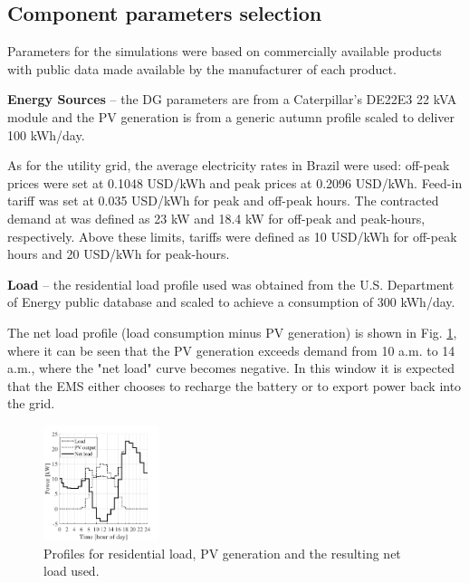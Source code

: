 \documentclass{ieeeaccess}
\begin{document}
    \subsection{Component parameters selection}
    Parameters for the simulations were based on commercially available products with public data made available by the manufacturer of each product.
    
    \textbf{Energy Sources} -- the \ac{DG} parameters are from a Caterpillar's DE22E3 22 kVA module and the \ac{PV} generation is from a generic autumn profile scaled to deliver 100 kWh/day.
    
    As for the utility grid, the average electricity rates in Brazil were used: off-peak prices were set at 0.1048 USD/kWh and peak prices at 0.2096 USD/kWh. Feed-in tariff was set at 0.035 USD/kWh for peak and off-peak hours. The contracted demand at was defined as 23 kW and 18.4 kW for off-peak and peak-hours, respectively. Above these limits, tariffs were defined as 10 USD/kWh for off-peak hours and 20 USD/kWh for peak-hours.
    
    \textbf{Load} -- the residential load profile used was obtained from the U.S. Department of Energy public database \cite{DOE2013} and scaled to achieve a consumption of 300 kWh/day.
    
    The net load profile (load consumption minus \ac{PV} generation) is shown in Fig. \ref{fig:net-load}, where it can be seen that the \ac{PV} generation exceeds demand from 10 a.m. to 14 a.m., where the "net load" curve becomes negative. In this window it is expected that the \ac{EMS} either chooses to recharge the battery or to export power back into the grid.
    \begin{figure}[htbp]
        \centering
        \includegraphics[width=0.3\textwidth]{figures/net_load.pdf}
        \caption{Profiles for residential load, \ac{PV} generation and the resulting net load used.}
        \label{fig:net-load}
    \end{figure}
	
\end{document}
